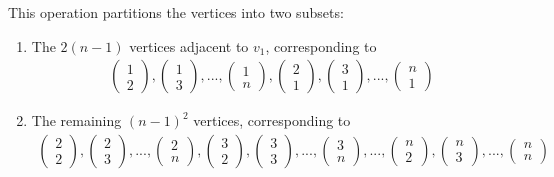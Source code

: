 \documentclass{article}
\begin{document}
This operation partitions the vertices into two subsets:
\begin{enumerate}
    \item The \( 2(n-1) \) vertices adjacent to \( v_1 \), corresponding to
    \begin{align*}
        \begin{pmatrix} 1 \\ 2 \end{pmatrix}, \begin{pmatrix} 1 \\ 3 \end{pmatrix},..., \begin{pmatrix} 1 \\ n \end{pmatrix}, \begin{pmatrix} 2 \\ 1 \end{pmatrix}, \begin{pmatrix} 3 \\ 1 \end{pmatrix},..., \begin{pmatrix} n \\ 1 \end{pmatrix} 
    \end{align*}
    \item The remaining \( (n-1)^2 \) vertices, corresponding to
    \begin{align*}
        \begin{pmatrix} 2 \\ 2 \end{pmatrix}, \begin{pmatrix} 2 \\ 3 \end{pmatrix},...,\begin{pmatrix} 2 \\ n \end{pmatrix},\begin{pmatrix} 3 \\ 2 \end{pmatrix}, \begin{pmatrix} 3 \\ 3 \end{pmatrix},...,\begin{pmatrix} 3 \\ n \end{pmatrix},...,\begin{pmatrix} n \\ 2 \end{pmatrix}, \begin{pmatrix} n \\ 3 \end{pmatrix},...,\begin{pmatrix} n \\ n \end{pmatrix}
    \end{align*}
\end{enumerate}
\end{document}

